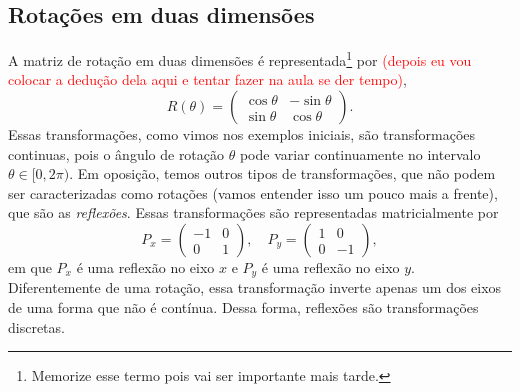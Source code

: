 \documentclass{article}
\numberwithin{equation}{section}
\numberwithin{figure}{section}
\begin{document}
\subsection{Rotações em duas dimensões}
A matriz de rotação em duas dimensões é representada\footnote{Memorize esse termo pois vai ser importante mais tarde.} por \textcolor{red}{(depois eu vou colocar a dedução dela aqui e tentar fazer na aula se der tempo)},
\begin{equation}\label{rotação 2d}
	R(\theta)=\begin{pmatrix}
		\cos\theta & -\sin\theta \\
		\sin\theta & \cos\theta 
	\end{pmatrix}.
\end{equation}
Essas transformações, como vimos nos exemplos iniciais, são transformações continuas, pois o ângulo de rotação $\theta$ pode variar continuamente no intervalo $\theta\in[0,2\pi)$. Em oposição, temos outros tipos de transformações, que não podem ser caracterizadas como rotações (vamos entender isso um pouco mais a frente), que são as \textit{reflexões}. Essas transformações são representadas matricialmente por
\begin{equation}
	P_x = \begin{pmatrix}
		-1 & 0 \\
		0 & 1
	\end{pmatrix},\quad 
	P_y= \begin{pmatrix}
		1 & 0 \\
		0 & -1
	\end{pmatrix},
\end{equation} em que $P_x$ é uma reflexão no eixo $x$ e $P_y$ é uma reflexão no eixo $y$. 
Diferentemente de uma rotação, essa transformação inverte apenas um dos eixos de uma forma que não é contínua. Dessa forma, reflexões são transformações discretas. 
\end{document}
